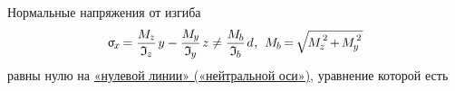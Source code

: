 \documentclass[14pt]{extarticle}
\newcommand{\lquote}[0]{«} %
\newcommand{\rquote}[0]{»} %
\newcommand{\inquotes}[1]{\lquote{#1}\rquote}
\begin{document}
Нормальные напряжения от изгиба
\[
\upsigma_{\hspace{-0.2ex}\scalebox{.8}{$x$}} \hspace{-0.2ex}
= \displaystyle\frac{M_{\hspace{-0.1ex}\scalebox{.8}{$z$}}}{\mathfrak{I}_{\hspace{-0.1ex}\scalebox{.8}{$z$}}} \hspace{.25ex} y
- \displaystyle\frac{M_{\hspace{-0.1ex}\scalebox{.8}{$y$}}}{\mathfrak{I}_{\hspace{-0.1ex}\scalebox{.8}{$y$}}} \hspace{.25ex} z
\neq \displaystyle\frac{M_{\hspace{-0.1ex}\scalebox{.8}{$b$}}}{\mathfrak{I}_{\hspace{-0.1ex}\scalebox{.8}{$b$}}} \hspace{.25ex} d
\hspace{.1ex} ,
\hspace{.4em}
M_{\hspace{-0.1ex}\scalebox{.8}{$b$}}
\hspace{-0.2ex}=\hspace{-0.2ex} \sqrt{\hspace{-0.2ex}M_{\hspace{-0.1ex}\scalebox{.8}{$z$}}^{\hspace{.2ex}\raisebox{.2em}{$\scriptstyle 2$}} \hspace{-0.2ex}+\hspace{-0.2ex} M_{\hspace{-0.1ex}\scalebox{.8}{$y$}}^{\hspace{.2ex}\raisebox{.2em}{$\scriptstyle 2$}}\hspace{.2ex}}
\]
равны нулю на \href{https://ru.wikipedia.org/wiki/%D0%9D%D0%B5%D0%B9%D1%82%D1%80%D0%B0%D0%BB%D1%8C%D0%BD%D0%B0%D1%8F_%D0%BE%D1%81%D1%8C}{\inquotes{нулевой линии} (\inquotes{нейтральной оси})}, уравнение которой есть
\end{document}
